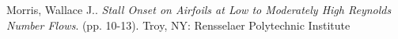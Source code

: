 Morris, Wallace J.. \emph{Stall Onset on Airfoils at Low to Moderately High Reynolds Number Flows}. (pp. 10-13). Troy, NY: Rensselaer Polytechnic Institute

